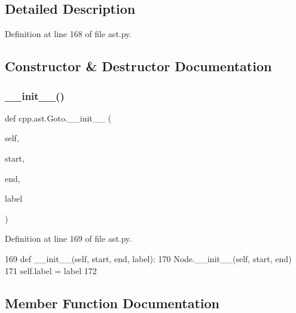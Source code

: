 \subsection{Detailed Description}


Definition at line 168 of file ast.\+py.



\subsection{Constructor \& Destructor Documentation}
\mbox{\label{classcpp_1_1ast_1_1Goto_a928e79374a90d01fc060985ea1e45260}} 
\subsubsection{\texorpdfstring{\+\_\+\+\_\+init\+\_\+\+\_\+()}{\_\_init\_\_()}}
{\footnotesize\ttfamily def cpp.\+ast.\+Goto.\+\_\+\+\_\+init\+\_\+\+\_\+ (\begin{DoxyParamCaption}\item[{}]{self,  }\item[{}]{start,  }\item[{}]{end,  }\item[{}]{label }\end{DoxyParamCaption})}



Definition at line 169 of file ast.\+py.


\begin{DoxyCode}
169     \textcolor{keyword}{def }\_\_init\_\_(self, start, end, label):
170         Node.\_\_init\_\_(self, start, end)
171         self.label = label
172 
\end{DoxyCode}


\subsection{Member Function Documentation}
\mbox{\label{classcpp_1_1ast_1_1Goto_a508b6bc091cf06bfed73a33368c236c9}} 
